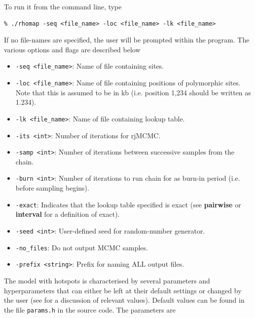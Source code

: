 \documentclass[a4paper,10pt,fullpage]{article}
\begin{document}
To run it from the
command line, type\\
\begin{verbatim}
% ./rhomap -seq <file_name> -loc <file_name> -lk <file_name> 
\end{verbatim}
If no file-names are specified, the user will be prompted within
the program.   The various options and flags are described below
\begin{itemize}

\item \verb+-seq <file_name>+: Name of file containing sites.

\item \verb+-loc <file_name>+: Name of file containing positions of polymorphic sites.  Note that this is assumed to be in kb (i.e. position 1,234 should be written as 1.234).

\item \verb+-lk <file_name>+: Name of file containing lookup table.

\item \verb+-its <int>+: Number of iterations for rjMCMC.

\item \verb+-samp <int>+: Number of iterations between successive samples from the chain.

\item \verb+-burn <int>+: Number of iterations to run chain for as burn-in period (i.e. before sampling begins).

\item \verb+-exact+: Indicates that the lookup table specified is exact (see {\bf pairwise} or {\bf interval} for a definition of exact).  

\item \verb+-seed <int>+: User-defined seed for random-number generator.

\item \verb+-no_files+: Do not output MCMC samples.

\item \verb+-prefix <string>+: Prefix for naming ALL output files.

\end{itemize}

The model with hotspots is characterised by several parameters and hyperparameters that can either be left at their default settings or changed by the user (see \cite{AutonMcVean07} for a discussion of relevant values).  Default values can be found in the file \verb+params.h+ in the source code.  The parameters are
\end{document}
